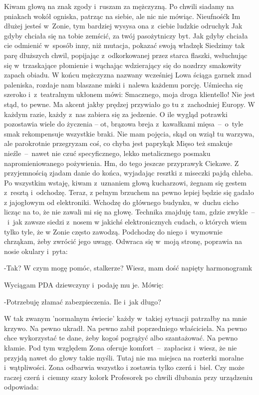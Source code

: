 \documentclass[../MAIN.tex]{subfiles}
\begin{document}
Kiwam głową na znak zgody i~ruszam za mężczyzną. Po chwili
siadamy na pniakach wokół ogniska, patrząc na siebie, ale nic
nie mówiąc. Nieufność\3k Im dłużej jesteś w~Zonie, tym bardziej
wysysa ona z~ciebie ludzkie odruchy\3k Jak gdyby chciała się na
tobie zemścić, za twój pasożytniczy byt. Jak gdyby chciała cie
odmienić w~sposób inny, niż mutacja, pokazać swoją władzę\3k
Siedzimy tak parę dłuższych chwil, popijając z~odkorkowanej
przez starca flaszki, wsłuchując się w~trzaskające płomienie i
wąchając wdzierający się do nozdrzy smakowity zapach obiadu. W
końcu mężczyzna nazwany wcześniej Lowa ściąga garnek znad
paleniska, rozdaje nam blaszane miski i~nalewa każdemu porcję.
Uśmiecha się szeroko i~z~teatralnym ukłonem mówi:
%
\sx Smacznego, moja droga klientello!
\qd
Nie jest stąd, to pewne. Ma akcent jakby prędzej przywiało go
tu z~zachodniej Europy. W każdym razie, każdy z~nas zabiera się
za jedzenie. O ile wygląd potrawki pozostawia wiele do życzenia
-- ot, brązowa breja z~kawałkami mię\-sa~--~o~tyle smak
rekompensuje wszystkie braki. Nie mam pojęcia, skąd on wziął tu
warzywa, ale parokrotnie przegryzam coś, co chyba jest
papryką\3k Mięso też smakuje nieźle~--~nawet nie czuć
specyficznego, lekko metalicznego posmaku napromieniowanego
pożywienia. Hm, do tego jeszcze przyprawy\3k Ciekawe. Z
przyjemnością zjadam danie do końca, wyjadając resztki z
miseczki pajdą chleba. Po wszystkim wstaję, kiwam z~uznaniem
głową kucharzowi, żegnam się gestem z~resztą i~odchodzę. Teraz,
z pełnym brzuchem na pewno lepiej będzie się gadało z
jajogłowym od elektroniki. Wchodzę do głównego budynku, w~duchu
cicho licząc na to, że nie zawali mi się na głowę. Technika
znajduję tam, gdzie zwykle~--~i~jak zawsze siedzi z~nosem w
jakichś elektronicznych cudach, o których wiem tylko tyle, że w
Zonie często zawodzą. Podchodzę do niego i~wymownie chrząkam,
żeby zwrócić jego uwagę. Odwraca się w~moją stronę, poprawia na
nosie okulary i~pyta:

-Tak? W czym mogę pomóc, stalkerze? Wiesz, mam dość napięty
harmonogram\3k

Wyciągam PDA dziewczyny i~podaję mu je. Mówię:

-Potrzebuję złamać zabezpieczenia. Ile i~jak długo?

W tak zwanym 'normalnym świecie' każdy w~takiej sytuacji
patrzałby na mnie krzywo. Na pewno ukradł. Na pewno zabił
poprzedniego właściciela. Na pewno chce wykorzystać te dane,
żeby kogoś pogrążyć albo szantażować. Na pewno kłamie. Pod tym
względem Zona oferuje komfort~--~zapłacisz i~wiesz, że nie
przyjdą nawet do głowy takie myśli. Tutaj nie ma miejsca na
rozterki moralne i~wątpliwości. Zona odbarwia wszystko i
zostawia tylko czerń i~biel. Czy może raczej czerń i~ciemny
szary kolor\3k Profesorek po chwili dłubania przy urządzeniu
odpowiada:
\end{document}
